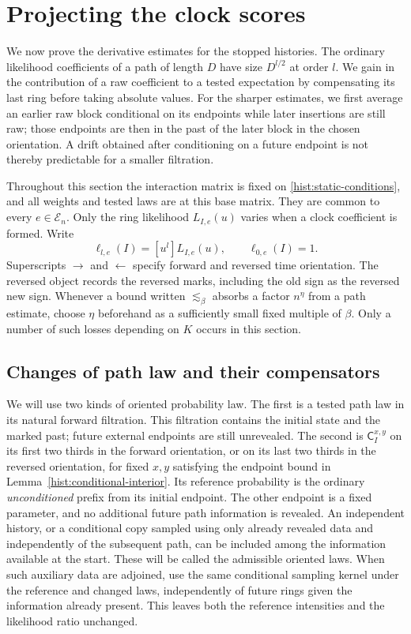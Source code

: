 \section{Projecting the clock scores}\label{sec:clock-scores}

We now prove the derivative estimates for the stopped histories.  The
ordinary likelihood coefficients of a path of length $D$ have size
$D^{l/2}$ at order $l$.  We gain in the contribution of a raw coefficient
to a tested expectation by compensating its last ring before taking absolute
values.  For the sharper estimates, we first average an earlier raw block
conditional on its endpoints while later insertions are still raw; those
endpoints are then in the past of the later block in the chosen orientation.
A drift obtained after conditioning on a future endpoint is not thereby
predictable for a smaller filtration.

Throughout this section the interaction matrix is fixed on
\eqref{hist:static-conditions}, and all weights and tested laws are at this
base matrix.  They are common to every $e\in\mathscr E_n$.  Only the ring
likelihood $L_{I,e}(u)$ varies when a clock coefficient is formed.  Write
\[
 \ell_{l,e}(I)=[u^l]L_{I,e}(u),\qquad \ell_{0,e}(I)=1.
\]
Superscripts $\to$ and $\leftarrow$ specify forward and reversed time
orientation.  The reversed object records the reversed marks, including
the old sign as the reversed new sign.
Whenever a bound written $\lesssim_\beta$ absorbs a factor $n^\eta$ from
a path estimate, choose $\eta$ beforehand as a sufficiently small fixed
multiple of $\beta$.  Only a number of such losses depending on $K$ occurs
in this section.

\subsection{Changes of path law and their compensators}

We will use two kinds of oriented probability law.  The first is a tested
path law in its natural forward filtration.  This filtration contains the
initial state and the marked past; future external endpoints are still
unrevealed.  The second is $\mathsf C_I^{x,y}$ on its first two thirds in
the forward orientation, or on its last two thirds in the reversed
orientation, for fixed $x,y$ satisfying the endpoint bound in
Lemma~\ref{hist:conditional-interior}.  Its reference probability is the
ordinary \emph{unconditioned} prefix from its initial endpoint.  The other
endpoint is a fixed parameter, and no additional future path information
is revealed.  An independent history, or a conditional copy sampled using
only already revealed data and independently of the subsequent path, can
be included among the information available at the start.  These will be
called the admissible oriented laws.
When such auxiliary data are adjoined, use the same conditional sampling
kernel under the reference and changed laws, independently of future rings
given the information already present.  This leaves both the reference
intensities and the likelihood ratio unchanged.


